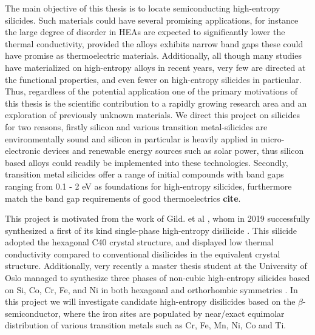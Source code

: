 \documentclass[UKenglish]{ifimaster}  %
\begin{document}
The main objective of this thesis is to locate semiconducting high-entropy silicides. Such materials could have several promising applications, for instance the large degree of disorder in HEAs are expected to significantly lower the thermal conductivity, provided the alloys exhibits narrow band gaps these could have promise as thermoelectric materials. Additionally, all though many studies have materialized on high-entropy alloys in recent years, very few are directed at the functional properties, and even fewer on high-entropy silicides in particular. Thus, regardless of the potential application one of the primary motivations of this thesis is the scientific contribution to a rapidly growing research area and an exploration of previously unknown materials. We direct this project on silicides for two reasons, firstly silicon and various transition metal-silicides are environmentally sound and silicon in particular is heavily applied in micro-electronic devices and renewable energy sources such as solar power, thus silicon based alloys could readily be implemented into these technologies. Secondly, transition metal silicides offer a range of initial compounds with band gaps ranging from 0.1 - 2 eV as foundations for high-entropy silicides, furthermore match the band gap requirements of good thermoelectrics \textbf{cite}. 

This project is motivated from the work of Gild. et al \cite{GILD2019337}, whom in 2019 successfully synthesized a first of its kind single-phase high-entropy disilicide . This silicide adopted the hexagonal C40 crystal structure, and displayed low thermal conductivity compared to conventional disilicides in the equivalent crystal structure. Additionally, very recently a master thesis student at the University of Oslo managed to synthesize three phases of non-cubic high-entropy silicides based on Si, Co, Cr, Fe, and Ni in both hexagonal and orthorhombic symmetries \cite{mari}. In this project we will investigate candidate high-entropy disilicides based on the $\beta$- semiconductor, where the iron sites are populated by near/exact equimolar distribution of various transition metals such as Cr, Fe, Mn, Ni, Co and Ti.  
\end{document}
